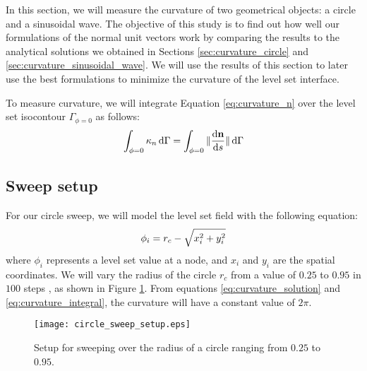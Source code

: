 In this section, we will measure the curvature of two geometrical objects: a circle and a sinusoidal wave. The objective of this study is to find out how well our formulations of the normal unit vectors work by comparing the results to the analytical solutions we obtained in Sections \ref{sec:curvature_circle} and \ref{sec:curvature_sinusoidal_wave}. We will use the results of this section to later use the best formulations to minimize the curvature of the level set interface.

To measure curvature, we will integrate Equation \ref{eq:curvature_n} over the level set isocontour $\Gamma_{\phi=0}$ as follows:
%
\begin{equation}
	\centering
	\label{eq:curvature_integral}
	\int_{\phi=0} \kappa_{n} \,\mathrm{d}\Gamma = \int_{\phi=0} \Vert \frac{\mathrm{d}\mathbf{n}}{\mathrm{d}s} \Vert \,\mathrm{d}\Gamma
\end{equation}
%

\subsection{Sweep setup}
\label{sec:sweep_setup}

For our circle sweep, we will model the level set field with the following equation:
%
\begin{equation}
	\centering
	\label{eq:level_set_circle}
	\phi_{i} = r_{c} - \sqrt{x_{i} ^ 2 + y_{i} ^ 2}
\end{equation}
%
where $\phi_{i}$ represents a level set value at a node, and $x_{i}$ and $y_{i}$ are the spatial coordinates. We will vary the radius of the circle $r_{c}$ from a value of $0.25$ to $0.95$ in $100$ steps , as shown in Figure \ref{fig:circle_sweep_setup}. From equations \ref{eq:curvature_solution} and \ref{eq:curvature_integral}, the curvature will have a constant value of $2\pi$.
%
\begin{figure}[H]
	\centering
	\texttt{[image: circle\_sweep\_setup.eps]}
	\caption{Setup for sweeping over the radius of a circle ranging from $0.25$ to $0.95$.}
	\label{fig:circle_sweep_setup}
\end{figure}

